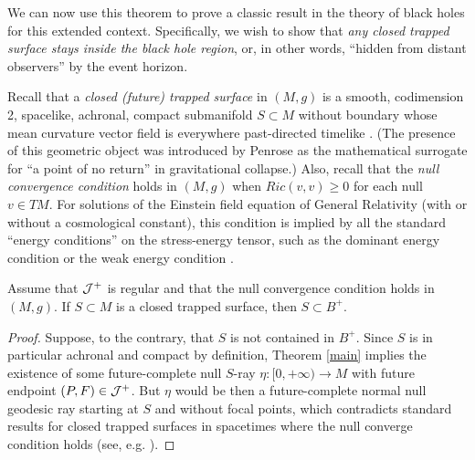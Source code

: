 
We can now use this theorem to prove a classic result in the theory of black holes \cite{BeemGlobalLorentzianGeometry1996,HawkingLargeScaleStructure1975,ONeillSemiRiemannianGeometryApplications1983}  for this extended context. Specifically, we wish to show that {\em any closed trapped surface stays inside the black hole region}, or, in other words, ``hidden from distant observers'' by the event horizon.

Recall that a {\em closed (future) trapped surface} in $(M,g)$ is a smooth, codimension 2, spacelike, achronal, compact submanifold $S \subset M$ without boundary whose mean curvature vector field is everywhere past-directed timelike \cite{ONeillSemiRiemannianGeometryApplications1983}. (The presence of this geometric object was introduced by Penrose \cite{PenroseGravitationalCollapse1965} as the mathematical surrogate for ``a point of no return'' in gravitational collapse.)  Also, recall that the {\em null convergence condition} holds in $(M,g)$ when $Ric(v,v) \geq 0$ for each null $v \in TM$. For solutions of the Einstein field equation of General Relativity (with or without a cosmological constant), this condition is implied by all the standard ``energy conditions'' on the stress-energy tensor, such as the dominant energy condition or the weak energy condition \cite{HawkingLargeScaleStructure1975,WaldGeneralRelativity1984}.

\begin{corollary}
\label{trappedcor}
Assume that ${\cal J}^+$ is regular and that the null convergence condition holds in $(M,g)$. If $S \subset M$ is a closed trapped surface, then $S \subset B^+$.
\end{corollary}
\begin{proof}
Suppose, to the contrary, that $S$ is not contained in $B^+$. Since $S$ is in particular achronal and compact by definition, Theorem \ref{main} implies the existence of some future-complete null $S$-ray $\eta: [0,+\infty) \rightarrow M$ with future endpoint $(P,F)\in {\cal J}^+$. But $\eta$ would be then a future-complete normal null geodesic ray starting at $S$ and without focal points, which contradicts standard results for closed trapped surfaces in spacetimes where the null converge condition holds (see, e.g. \cite{BeemGlobalLorentzianGeometry1996,HawkingLargeScaleStructure1975,ONeillSemiRiemannianGeometryApplications1983}).
\end{proof}

